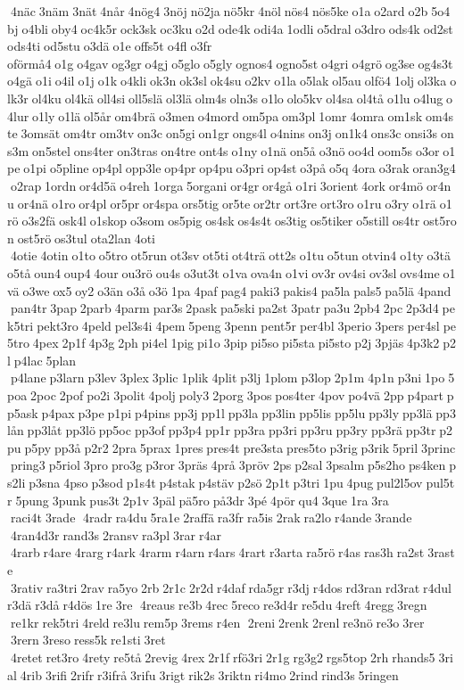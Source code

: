 4näc 3näm 3nät 4når 4nög4 3nöj nö2ja nö5kr 4nöl nös4 nös5ke o1a o2ard o2b 5o4bj o4bli oby4 oc4k5r ock3sk oc3ku o2d ode4k odi4a 1odli o5dral o3dro ods4k od2st ods4ti od5stu o3dä o1e offs5t o4fl o3fr 	oförmå4 o1g o4gav og3gr o4gj o5glo o5gly ognos4 ogno5st o4gri o4grö og3se og4s3t o4gä o1i o4il o1j o1k o4kli ok3n ok3sl ok4su o2kv o1la o5lak ol5au olfö4 1olj ol3ka olk3r ol4ku ol4kä oll4si oll5slä ol3lä olm4s oln3s o1lo olo5kv ol4sa ol4tå o1lu o4lug o4lur o1ly o1lä ol5år om4brä o3men o4mord om5pa om3pl 1omr 4omra om1sk om4ste 3omsät om4tr om3tv on3c on5gi on1gr ongs4l o4nins on3j on1k4 ons3c onsi3s ons3m on5stel ons4ter on3tras on4tre ont4s o1ny o1nä on5å o3nö oo4d oom5s o3or o1pe o1pi o5pline op4pl opp3le op4pr op4pu o3pri op4st o3på o5q 4ora o3rak oran3g4 o2rap 1ordn or4d5ä o4reh 1orga 5organi or4gr or4gå o1ri 3orient 4ork or4mö or4nu or4nä o1ro or4pl or5pr or4spa ors5tig or5te or2tr ort3re ort3ro o1ru o3ry o1rä o1rö o3s2fä osk4l o1skop o3som os5pig os4sk os4s4t os3tig os5tiker o5still os4tr ost5ron ost5rö os3tul ota2lan 4oti  4otie 4otin o1to o5tro ot5run ot3sv ot5ti ot4trä ott2s o1tu o5tun otvin4 o1ty o3tä o5tå oun4 oup4 4our ou3rö ou4s o3ut3t o1va ova4n o1vi ov3r ov4si ov3sl ovs4me o1vä o3we ox5 oy2 o3än o3å o3ö 1pa 4paf pag4 paki3 pakis4 pa5la pals5 pa5lä 4pand  pan4tr 3pap 2parb 4parm par3s 2pask pa5ski pa2st 3patr pa3u 2pb4 2pc 2p3d4 pek5tri pekt3ro 4peld pel3s4i 4pem 5peng 3penn pent5r per4bl 3perio 3pers per4sl pe5tro 4pex 2p1f 4p3g 2ph pi4el 1pig pi1o 3pip pi5so pi5sta pi5sto p2j 3pjäs 4p3k2 p2l p4lac 5plan  p4lane p3larn p3lev 3plex 3plic 1plik 4plit p3lj 1plom p3lop 2p1m 4p1n p3ni 1po 5poa 2poc 2pof po2i 3polit 4polj poly3 2porg 3pos pos4ter 4pov po4vä 2pp p4part pp5ask p4pax p3pe p1pi p4pins pp3j pp1l pp3la pp3lin pp5lis pp5lu pp3ly pp3lä pp3lån pp3låt pp3lö pp5oc pp3of pp3p4 pp1r pp3ra pp3ri pp3ru pp3ry pp3rä pp3tr p2pu p5py pp3å p2r2 2pra 5prax 1pres pres4t pre3sta pres5to p3rig p3rik 5pril 3princ pring3 p5riol 3pro pro3g p3ror 3präs 4prå 3pröv 2ps p2sal 3psalm p5s2ho ps4ken ps2li p3sna 4pso p3sod p1s4t p4stak p4stäv p2sö 2p1t p3tri 1pu 4pug pul2l5ov pul5tr 5pung 3punk pus3t 2p1v 3päl pä5ro på3dr 3pé 4pör qu4 3que 1ra 3ra  raci4t 3rade  4radr ra4du 5ra1e 2raffä ra3fr ra5is 2rak ra2lo r4ande 3rande  4ran4d3r rand3s 2ransv ra3pl 3rar r4ar  4rarb r4are 4rarg r4ark 4rarm r4arn r4ars 4rart r3arta ra5rö r4as ras3h ra2st 3raste  3rativ ra3tri 2rav ra5yo 2rb 2r1c 2r2d r4daf rda5gr r3dj r4dos rd3ran rd3rat r4dul r3dä r3då r4dös 1re 3re  4reaus re3b 4rec 5reco re3d4r re5du 4reft 4regg 3regn  re1kr rek5tri 4reld re3lu rem5p 3rems r4en  2reni 2renk 2renl re3nö re3o 3rer  3rern 3reso ress5k re1sti 3ret  4retet ret3ro 4rety re5tå 2revig 4rex 2r1f rfö3ri 2r1g rg3g2 rgs5top 2rh rhands5 3rial 4rib 3rifi 2rifr r3ifrå 3rifu 3rigt rik2s 3riktn ri4mo 2rind rind3s 5ringen 